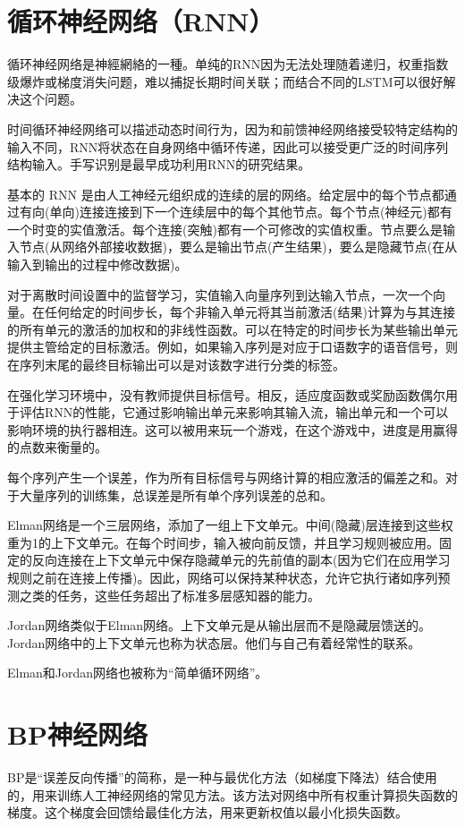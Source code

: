 \documentclass[UTF8]{ctexart}
\begin{document}
\section{循环神经网络（RNN）}
循环神经网络是神經網絡的一種。单纯的RNN因为无法处理随着递归，权重指数级爆炸或梯度消失问题，难以捕捉长期时间关联；而结合不同的LSTM可以很好解决这个问题。

时间循环神经网络可以描述动态时间行为，因为和前馈神经网络接受较特定结构的输入不同，RNN将状态在自身网络中循环传递，因此可以接受更广泛的时间序列结构输入。手写识别是最早成功利用RNN的研究结果。

基本的 RNN 是由人工神经元组织成的连续的层的网络。给定层中的每个节点都通过有向(单向)连接连接到下一个连续层中的每个其他节点。每个节点(神经元)都有一个时变的实值激活。每个连接(突触)都有一个可修改的实值权重。节点要么是输入节点(从网络外部接收数据)，要么是输出节点(产生结果)，要么是隐藏节点(在从输入到输出的过程中修改数据)。

对于离散时间设置中的监督学习，实值输入向量序列到达输入节点，一次一个向量。在任何给定的时间步长，每个非输入单元将其当前激活(结果)计算为与其连接的所有单元的激活的加权和的非线性函数。可以在特定的时间步长为某些输出单元提供主管给定的目标激活。例如，如果输入序列是对应于口语数字的语音信号，则在序列末尾的最终目标输出可以是对该数字进行分类的标签。

在强化学习环境中，没有教师提供目标信号。相反，适应度函数或奖励函数偶尔用于评估RNN的性能，它通过影响输出单元来影响其输入流，输出单元和一个可以影响环境的执行器相连。这可以被用来玩一个游戏，在这个游戏中，进度是用赢得的点数来衡量的。

每个序列产生一个误差，作为所有目标信号与网络计算的相应激活的偏差之和。对于大量序列的训练集，总误差是所有单个序列误差的总和。

Elman网络是一个三层网络，添加了一组上下文单元。中间(隐藏)层连接到这些权重为1的上下文单元。在每个时间步，输入被向前反馈，并且学习规则被应用。固定的反向连接在上下文单元中保存隐藏单元的先前值的副本(因为它们在应用学习规则之前在连接上传播)。因此，网络可以保持某种状态，允许它执行诸如序列预测之类的任务，这些任务超出了标准多层感知器的能力。

Jordan网络类似于Elman网络。上下文单元是从输出层而不是隐藏层馈送的。Jordan网络中的上下文单元也称为状态层。他们与自己有着经常性的联系。

Elman和Jordan网络也被称为“简单循环网络”。
\section{BP神经网络}
BP是“误差反向传播”的简称，是一种与最优化方法（如梯度下降法）结合使用的，用来训练人工神经网络的常见方法。该方法对网络中所有权重计算损失函数的梯度。这个梯度会回馈给最佳化方法，用来更新权值以最小化损失函数。
\end{document}
